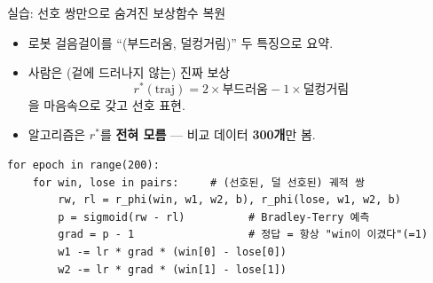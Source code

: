 \begin{frame}[fragile]{실습: 선호 쌍만으로 숨겨진 보상함수 복원}
  \begin{itemize}
    \item 로봇 걸음걸이를 ``(부드러움, 덜컹거림)'' 두 특징으로 요약.
    \item 사람은 (겉에 드러나지 않는) 진짜 보상
      \[r^*(\text{traj})=2\times\text{부드러움}-1\times\text{덜컹거림}\]
      을 마음속으로 갖고 선호 표현.
    \item 알고리즘은 $r^*$를 \textbf{전혀 모름} — 비교 데이터
      \textbf{300개}만 봄.
\end{itemize}
\begin{lstlisting}
for epoch in range(200):
    for win, lose in pairs:     # (선호된, 덜 선호된) 궤적 쌍
        rw, rl = r_phi(win, w1, w2, b), r_phi(lose, w1, w2, b)
        p = sigmoid(rw - rl)          # Bradley-Terry 예측
        grad = p - 1                  # 정답 = 항상 "win이 이겼다"(=1)
        w1 -= lr * grad * (win[0] - lose[0])
        w2 -= lr * grad * (win[1] - lose[1])
\end{lstlisting}
\end{frame}
